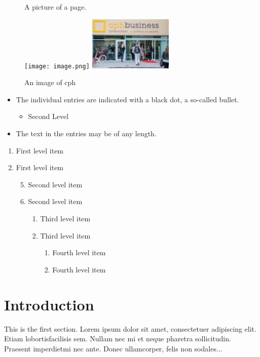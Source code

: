 \documentclass{article}
\begin{document}
\begin{figure}[htp]
    \caption{A picture of a page.}
    \centering
    \texttt{[image: image.png]}
    \includegraphics[width=4cm]{stego.png}
    \caption{An image of cph}
    \label{fig:galaxy}
\end{figure}

\begin{itemize}
  \item The individual entries are indicated with a black dot, a so-called bullet.
       \begin{itemize}
        \item  Second Level
    \end{itemize}
  \item The text in the entries may be of any length.
\end{itemize}

\renewcommand{\labelenumii}{\Roman{enumii}}
\begin{enumerate}
   \item First level item
   \item First level item
   \begin{enumerate}
     \setcounter{enumii}{4}
     \item Second level item
     \item Second level item
       \begin{enumerate}
       \item Third level item
       \item Third level item
         \begin{enumerate}
         \item Fourth level item
         \item Fourth level item
       \end{enumerate}
     \end{enumerate}
   \end{enumerate}
 \end{enumerate}


\section{Introduction}
   
This is the first section.
Lorem  ipsum  dolor  sit  amet,  consectetuer  adipiscing  
elit.   Etiam  lobortisfacilisis sem.  Nullam nec mi et 
neque pharetra sollicitudin.  Praesent imperdietmi nec ante. 
Donec ullamcorper, felis non sodales...
       
\end{document}
